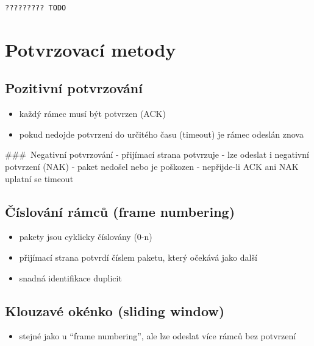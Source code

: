 \documentclass{szzclass}
\providecommand{\tightlist}{%
  \setlength{\itemsep}{0pt}\setlength{\parskip}{0pt}}
\begin{document}
\begin{verbatim}
????????? TODO
\end{verbatim}

\hypertarget{potvrzovacuxed-metody}{%
\section{Potvrzovací metody}\label{potvrzovacuxed-metody}}

\hypertarget{pozitivnuxed-potvrzovuxe1nuxed}{%
\subsection{Pozitivní
potvrzování}\label{pozitivnuxed-potvrzovuxe1nuxed}}

\begin{itemize}
\tightlist
\item
  každý rámec musí být potvrzen (ACK)
\item
  pokud nedojde potvrzení do určitého času (timeout) je rámec odeslán
  znova
\end{itemize}

\#\#\#~Negativní potvrzování - přijímací strana potvrzuje - lze odeslat
i negativní potvrzení (NAK) - paket nedošel nebo je poškozen -
nepřijde-li ACK ani NAK uplatní se timeout

\hypertarget{ux10duxedslovuxe1nuxed-ruxe1mcux16f-frame-numbering}{%
\subsection{Číslování rámců (frame
numbering)}\label{ux10duxedslovuxe1nuxed-ruxe1mcux16f-frame-numbering}}

\begin{itemize}
\tightlist
\item
  pakety jsou cyklicky číslovány (0-n)
\item
  přijímací strana potvrdí číslem paketu, který očekává jako další
\item
  snadná identifikace duplicit
\end{itemize}

\hypertarget{klouzavuxe9-okuxe9nko-sliding-window}{%
\subsection{Klouzavé okénko (sliding
window)}\label{klouzavuxe9-okuxe9nko-sliding-window}}

\begin{itemize}
\tightlist
\item
  stejné jako u ``frame numbering'', ale lze odeslat více rámců bez
  potvrzení
\end{itemize}
\end{document}
